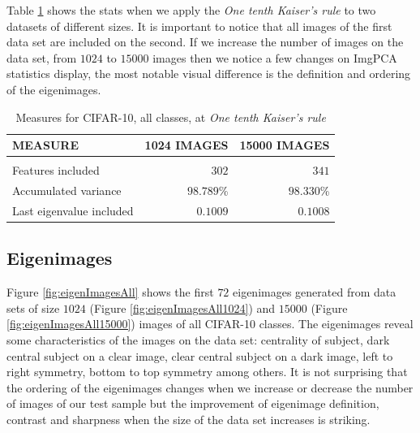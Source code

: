 \documentclass{article} %
\begin{document}
Table \ref{tab:ImgPCAcomputations} shows the stats when we apply the \emph{One tenth Kaiser's rule} to two datasets of different sizes. It is important to notice that all images of the first data set are included on the second. If we increase the number of images on the data set, from $1024$ to $15000$ images then we notice a few changes on ImgPCA statistics display, the most notable visual difference is the definition and ordering of the eigenimages.

\begin{table}[h]
\caption{Measures for CIFAR-10, all classes, at \emph{One tenth Kaiser's rule}}
\label{tab:ImgPCAcomputations}
\begin{center}
\begin{tabular}{lrr}
\multicolumn{1}{l}{\bf MEASURE}  &\multicolumn{1}{r}{\bf 1024 IMAGES}&\multicolumn{1}{r}{\bf 15000 IMAGES}
\\ \hline \\
Features included       &$302$ & $341$\\
Accumulated variance             &$98.789$\% & $98.330$\%\\
Last eigenvalue included&$0.1009$&$0.1008$\\
\end{tabular}
\end{center}
\end{table}

\subsection{Eigenimages}
Figure \ref{fig:eigenImagesAll} shows the first $72$ eigenimages generated from data sets of size $1024$ (Figure \ref{fig:eigenImagesAll1024}) and $15000$ (Figure \ref{fig:eigenImagesAll15000}) images of all CIFAR-10 classes. The eigenimages reveal some characteristics of the images on the data set: centrality of subject, dark central subject on a clear image, clear central subject on a dark image, left to right symmetry, bottom to top symmetry among others. It is not surprising that the ordering of the eigenimages changes when we increase or decrease the number of images of our test sample but the improvement of eigenimage definition, contrast and sharpness when the size of the data set increases is striking.
\end{document}
